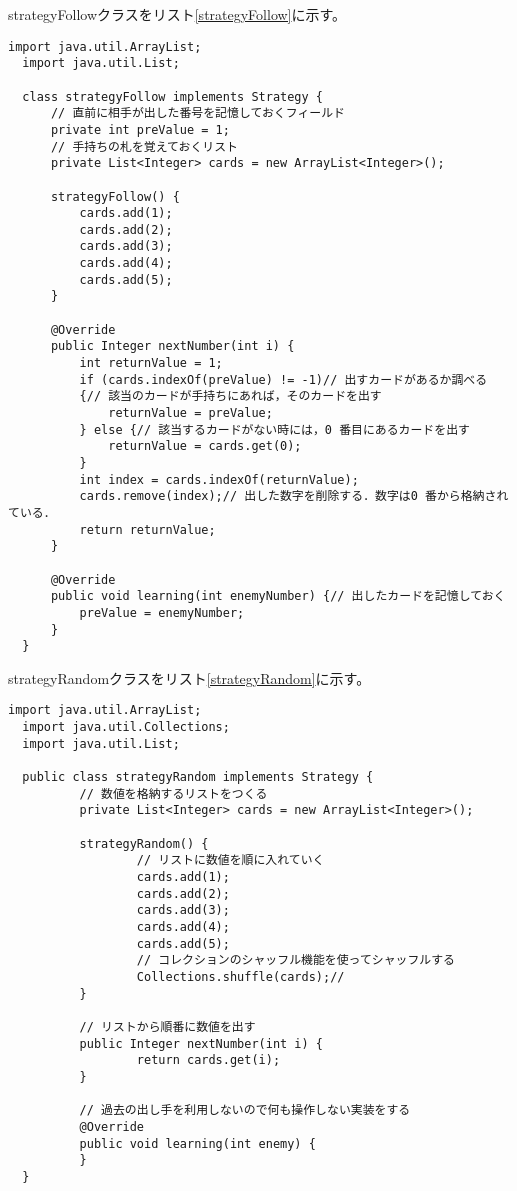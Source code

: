\documentclass[a4paper,11pt,dvipdfmx]{jsarticle}
\begin{document}
strategyFollowクラスをリスト\ref{strategyFollow}に示す。

\begin{lstlisting}[caption=strategyFollowクラス,label=strategyFollow]
  import java.util.ArrayList;
  import java.util.List;
  
  class strategyFollow implements Strategy {
      // 直前に相手が出した番号を記憶しておくフィールド
      private int preValue = 1;
      // 手持ちの札を覚えておくリスト
      private List<Integer> cards = new ArrayList<Integer>();
  
      strategyFollow() {
          cards.add(1);
          cards.add(2);
          cards.add(3);
          cards.add(4);
          cards.add(5);
      }
  
      @Override
      public Integer nextNumber(int i) {
          int returnValue = 1;
          if (cards.indexOf(preValue) != -1)// 出すカードがあるか調べる
          {// 該当のカードが手持ちにあれば，そのカードを出す
              returnValue = preValue;
          } else {// 該当するカードがない時には，0 番目にあるカードを出す
              returnValue = cards.get(0);
          }
          int index = cards.indexOf(returnValue);
          cards.remove(index);// 出した数字を削除する．数字は0 番から格納されている．
          return returnValue;
      }
  
      @Override
      public void learning(int enemyNumber) {// 出したカードを記憶しておく
          preValue = enemyNumber;
      }
  }
\end{lstlisting}

strategyRandomクラスをリスト\ref{strategyRandom}に示す。

\begin{lstlisting}[caption=strategyRandomクラス,label=strategyRandom]
  import java.util.ArrayList;
  import java.util.Collections;
  import java.util.List;
  
  public class strategyRandom implements Strategy {
          // 数値を格納するリストをつくる
          private List<Integer> cards = new ArrayList<Integer>();
  
          strategyRandom() {
                  // リストに数値を順に入れていく
                  cards.add(1);
                  cards.add(2);
                  cards.add(3);
                  cards.add(4);
                  cards.add(5);
                  // コレクションのシャッフル機能を使ってシャッフルする
                  Collections.shuffle(cards);//
          }
  
          // リストから順番に数値を出す
          public Integer nextNumber(int i) {
                  return cards.get(i);
          }
  
          // 過去の出し手を利用しないので何も操作しない実装をする
          @Override
          public void learning(int enemy) {
          }
  }
\end{lstlisting}
\end{document}
